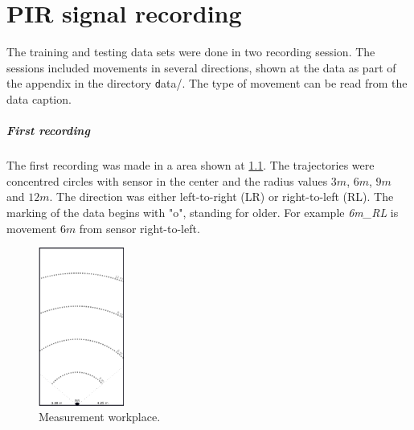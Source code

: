


\chapter{PIR signal recording}
\label{appendix:PIRSignal}

The training and testing data sets were done in two recording session.
The sessions included movements in several directions, shown at the
data as part of the appendix in the directory {\texttt data/}. The
type of movement can be read from the data caption.

\paragraph{First recording}
The first recording was made in a area shown at \ref{fig:measurement}.
The trajectories were concentred circles with sensor in the center
and the radius values $3m$, $6m$, $9m$ and $12m$.
The direction was either left-to-right (LR) or right-to-left (RL).
The marking of the data begins with "o", standing for older.
For example {\it 6m\_RL} is movement $6m$ from sensor right-to-left.

\begin{figure}[!ht]
\begin{center}
\includegraphics[width=0.25\textwidth]{render/measurement.png}
\caption{Measurement workplace.\label{fig:measurement}}
\end{center}
\end{figure}

